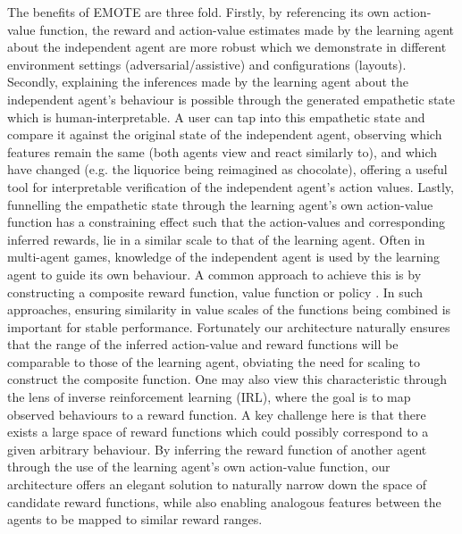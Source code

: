The benefits of EMOTE are three fold. Firstly, by referencing its own action-value function, the reward and action-value estimates made by the learning agent about the independent agent are more robust which we demonstrate in different environment settings (adversarial/assistive) and configurations (layouts).
Secondly, explaining the inferences made by the learning agent about the independent agent's behaviour is possible through the generated empathetic state which is human-interpretable. A user can tap into this empathetic state and compare it against the original state of the independent agent, observing which features remain the same (both agents view and react similarly to), and which have changed (e.g. the liquorice being reimagined as chocolate), offering a useful tool for interpretable verification of the independent agent's action values.
Lastly, funnelling the empathetic state through the learning agent's own action-value function has a constraining effect
such that the action-values and corresponding inferred rewards, lie in a similar scale to that of the learning agent. Often in multi-agent games, knowledge of the independent agent is used by the learning agent to guide its own behaviour. A common approach to achieve this is by constructing a composite reward function, value function or policy \cite{Noothigattu2019,alamdari2021considerate}. In such approaches, ensuring similarity in value scales of the functions being combined is important for stable performance. Fortunately our architecture naturally ensures that the range of the inferred action-value and reward functions will be comparable to those of the learning agent, obviating the need for scaling to construct the composite function. One may also view this characteristic through the lens of inverse reinforcement learning (IRL), where the goal is to map observed behaviours to a reward function. A key challenge here is that there exists a large space of reward functions which could possibly correspond to a given arbitrary behaviour. By inferring the reward function of another agent through the use of the learning agent's own action-value function, our architecture offers an elegant solution to naturally narrow down the space of candidate reward functions, while also enabling analogous features between the agents to be mapped to similar reward ranges.

